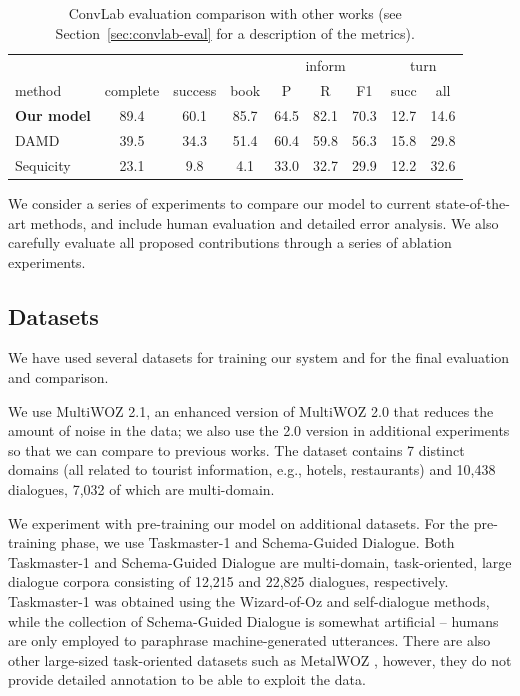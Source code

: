 \documentclass[11pt,a4paper]{article}
\newcommand{\multiwoz}[0]{MultiWOZ 2.0\xspace}
\newcommand{\multiwozn}[0]{MultiWOZ 2.1\xspace}
\newcommand{\taskmaster}[0]{Taskmaster-1\xspace}
\newcommand{\schema}[0]{Schema-Guided Dialogue\xspace}
\newcommand{\Augpt}[0]{Our model\xspace}
\begin{document}
\begin{table}[htbp]
    \centering
    \begin{tabular}{l|ccc|ccc|cc}
      \toprule
       &  & & & \multicolumn{3}{c|}{inform} & \multicolumn{2}{c}{turn} \\
      method & complete & success & book & P & R & F1 & succ & all \\
      \midrule
      \textbf{\Augpt} & 89.4 & 60.1 & 85.7 & 64.5 & 82.1 & 70.3 & 12.7 & 14.6 \\
      DAMD \cite{zhang2019} & 39.5 & 34.3 & 51.4 & 60.4 & 59.8 & 56.3 & 15.8 & 29.8\\
      Sequicity \cite{lei2018} & 23.1 & \phantom{0}9.8 & \phantom{0}4.1 & 33.0 & 32.7 & 29.9 & 12.2 & 32.6 \\
      \bottomrule
  \end{tabular}
  \caption{ConvLab evaluation comparison with other works (see Section~\ref{sec:convlab-eval} for a description of the metrics).}
  \label{tab:multiwoz_convlab_comparison}
\end{table}


We consider a series of experiments to compare our model to current state-of-the-art methods, and include human evaluation and detailed error analysis.
We also carefully evaluate all proposed contributions through a series of ablation experiments.

\subsection{Datasets}
We have used several datasets for training our system and for the final evaluation and comparison. 

We use \multiwozn, an enhanced version of \multiwoz \cite{budzianowski2018} that reduces the amount of noise in the data; we also use the 2.0 version in additional experiments so that we can compare to previous works.
The dataset contains 7 distinct domains (all related to tourist information, e.g., hotels, restaurants) and 10,438 dialogues, 7,032 of which are multi-domain.


We experiment with pre-training our model on additional datasets.
For the pre-training phase, we use \taskmaster \cite{byrne2019} and \schema \cite{rastogi2019}.
Both \taskmaster and \schema are multi-domain, task-oriented, large dialogue corpora consisting of 12,215 and 22,825 dialogues, respectively.
\taskmaster was obtained using the Wizard-of-Oz and self-dialogue methods, while the collection of \schema is somewhat artificial -- humans are only employed to paraphrase machine-generated utterances.
There are also other large-sized task-oriented datasets such as MetalWOZ \cite{lee2019multi}, however, they do not provide detailed annotation  to be able to exploit the data.
\end{document}
